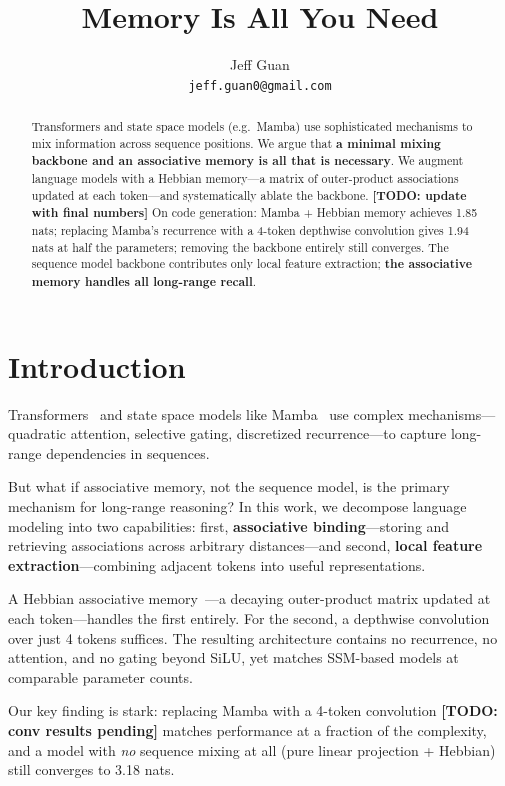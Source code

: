 \documentclass{article}
\title{Memory Is All You Need}
\author{
  Jeff Guan \\
  \texttt{jeff.guan0@gmail.com}
}
\begin{document}
\maketitle

\begin{abstract}
Transformers and state space models (e.g.\ Mamba) use sophisticated mechanisms to mix information across sequence positions. We argue that \textbf{a minimal mixing backbone and an associative memory is all that is necessary}. We augment language models with a Hebbian memory---a matrix of outer-product associations updated at each token---and systematically ablate the backbone. \textbf{[TODO: update with final numbers]} On code generation: Mamba + Hebbian memory achieves 1.85 nats; replacing Mamba's recurrence with a 4-token depthwise convolution gives 1.94 nats at half the parameters; removing the backbone entirely still converges. The sequence model backbone contributes only local feature extraction; \textbf{the associative memory handles all long-range recall}.
\end{abstract}

\section{Introduction}

Transformers~\citep{vaswani2017attention} and state space models like Mamba~\citep{gu2024mamba,dao2024mamba2} use complex mechanisms---quadratic attention, selective gating, discretized recurrence---to capture long-range dependencies in sequences.

But what if associative memory, not the sequence model, is the primary mechanism for long-range reasoning? In this work, we decompose language modeling into two capabilities: first, \textbf{associative binding}---storing and retrieving associations across arbitrary distances---and second, \textbf{local feature extraction}---combining adjacent tokens into useful representations.

A Hebbian associative memory~\citep{hebb1949organization}---a decaying outer-product matrix updated at each token---handles the first entirely. For the second, a depthwise convolution over just 4 tokens suffices. The resulting architecture contains no recurrence, no attention, and no gating beyond SiLU, yet matches SSM-based models at comparable parameter counts.

Our key finding is stark: replacing Mamba with a 4-token convolution \textbf{[TODO: conv results pending]} matches performance at a fraction of the complexity, and a model with \emph{no} sequence mixing at all (pure linear projection + Hebbian) still converges to 3.18 nats. 
\end{document}
